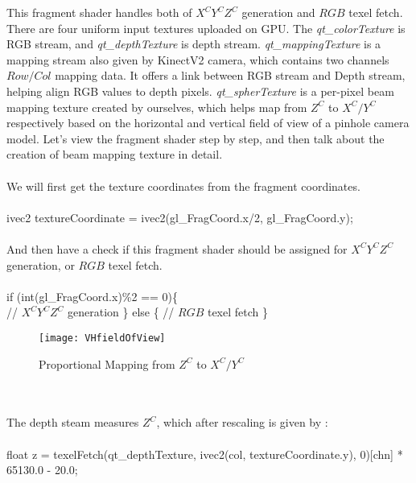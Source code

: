 %
This fragment shader handles both of \(X^CY^CZ^C\) generation and \(RGB\) texel fetch. There are four uniform input textures uploaded on GPU. The \emph{qt\_colorTexture} is RGB stream, and \emph{qt\_depthTexture} is depth stream. \emph{qt\_mappingTexture} is a mapping stream also given by KinectV2 camera, which contains two channels \(Row/Col\) mapping data. It offers a link between RGB stream and Depth stream, helping align RGB values to depth pixels. \emph{qt\_spherTexture} is a per-pixel beam mapping texture created by ourselves, which helps map from \(Z^C\) to \(X^C/Y^C\) respectively based on the horizontal and vertical field of view of a pinhole camera model. Let's view the fragment shader step by step, and then talk about the creation of beam mapping texture in detail.%
\\\\
We will first get the texture coordinates from the fragment coordinates.
\\\\
    ivec2 textureCoordinate = ivec2(gl\_FragCoord.x/2, gl\_FragCoord.y);
\\\\
And then have a check if this fragment shader should be assigned for \(X^CY^CZ^C\) generation, or \(RGB\) texel fetch.\\\\
    if (int(gl\_FragCoord.x)\%2 == 0)\{\\
 		// \(X^CY^CZ^C\) generation
    \} else \{
		// \(RGB\) texel fetch
    \}%
%
%
\begin{figure}[!b]
\centering
\texttt{[image: VHfieldOfView]}
\caption{Proportional Mapping from \(Z^C\) to \(X^C/Y^C\)}
\label{VHfieldOfView}
\end{figure}%
%
\\\\
The depth steam measures \(Z^C\), which after rescaling is given by :
\\\\
        float z = texelFetch(qt\_depthTexture, ivec2(col, textureCoordinate.y), 0)[chn] * 65130.0 - 20.0;
\\\\

